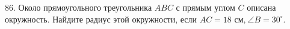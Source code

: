 86. Около прямоугольного треугольника $ABC$ с прямым углом $C$ описана окружность. Найдите радиус этой окружности, если $AC=18\text{ см,}\ \angle B=30^\circ.$\\
